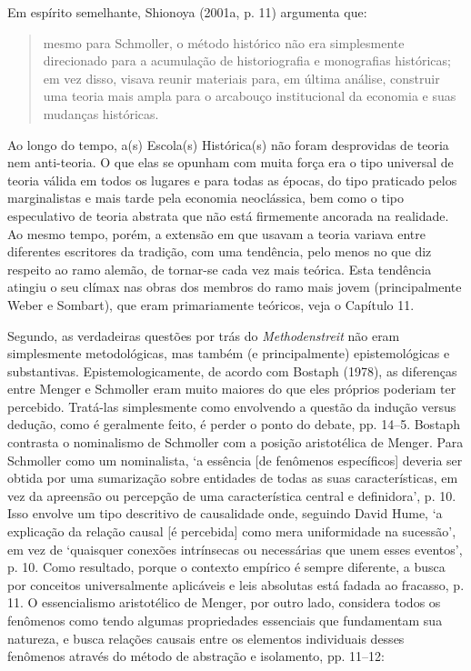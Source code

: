 \documentclass[12pt]{article}
\begin{document}
Em espírito semelhante, Shionoya (2001a, p. 11) argumenta que:

\begin{quote}
mesmo para Schmoller, o método histórico não era simplesmente direcionado para a acumulação de historiografia e monografias históricas; em vez disso, visava reunir materiais para, em última análise, construir uma teoria mais ampla para o arcabouço institucional da economia e suas mudanças históricas.
\end{quote}

Ao longo do tempo, a(s) Escola(s) Histórica(s) não foram desprovidas de teoria nem anti-teoria. O que elas se opunham com muita força era o tipo universal de teoria válida em todos os lugares e para todas as épocas, do tipo praticado pelos marginalistas e mais tarde pela economia neoclássica, bem como o tipo especulativo de teoria abstrata que não está firmemente ancorada na realidade. Ao mesmo tempo, porém, a extensão em que usavam a teoria variava entre diferentes escritores da tradição, com uma tendência, pelo menos no que diz respeito ao ramo alemão, de tornar-se cada vez mais teórica. Esta tendência atingiu o seu clímax nas obras dos membros do ramo mais jovem (principalmente Weber e Sombart), que eram primariamente teóricos, veja o Capítulo 11.

Segundo, as verdadeiras questões por trás do \textit{Methodenstreit} não eram simplesmente metodológicas, mas também (e principalmente) epistemológicas e substantivas. Epistemologicamente, de acordo com Bostaph (1978), as diferenças entre Menger e Schmoller eram muito maiores do que eles próprios poderiam ter percebido. Tratá-las simplesmente como envolvendo a questão da indução versus dedução, como é geralmente feito, é perder o ponto do debate, pp. 14–5. Bostaph contrasta o nominalismo de Schmoller com a posição aristotélica de Menger. Para Schmoller como um nominalista, ‘a essência [de fenômenos específicos] deveria ser obtida por uma sumarização sobre entidades de todas as suas características, em vez da apreensão ou percepção de uma característica central e definidora’, p. 10. Isso envolve um tipo descritivo de causalidade onde, seguindo David Hume, ‘a explicação da relação causal [é percebida] como mera uniformidade na sucessão’, em vez de ‘quaisquer conexões intrínsecas ou necessárias que unem esses eventos’, p. 10. Como resultado, porque o contexto empírico é sempre diferente, a busca por conceitos universalmente aplicáveis e leis absolutas está fadada ao fracasso, p. 11. O essencialismo aristotélico de Menger, por outro lado, considera todos os fenômenos como tendo algumas propriedades essenciais que fundamentam sua natureza, e busca relações causais entre os elementos individuais desses fenômenos através do método de abstração e isolamento, pp. 11–12:
\end{document}
